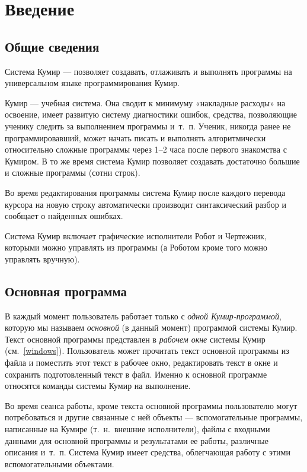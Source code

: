 \documentclass[12pt,a4paper]{article}
\begin{document}

\section{Введение}

\subsection{Общие сведения}

Система Кумир --- позволяет создавать, отлаживать и выполнять программы на универсальном языке программирования Кумир.

Кумир --- учебная система. Она сводит к минимуму «накладные расходы» на освоение, имеет развитую систему диагностики ошибок, средства, позволяющие ученику следить за выполнением программы и~т.~п. Ученик, никогда ранее не программировавший, может начать писать и выполнять алгоритмически относительно сложные программы через 1--2 часа после первого знакомства с Кумиром. В то же время система Кумир позволяет создавать достаточно большие и сложные программы (сотни строк).

Во время редактирования программы система Кумир после каждого перевода курсора на новую строку автоматически производит синтаксический разбор и сообщает о найденных ошибках.

Система Кумир включает графические исполнители Робот и Чертежник, которыми можно управлять из программы (а Роботом кроме того можно управлять вручную). 

\subsection{Основная программа}

В каждый момент  пользователь работает только с \emph{одной Кумир-программой}, которую мы называем \emph{основной} (в данный момент) программой системы Кумир. Текст основной программы представлен в \emph{рабочем окне} системы Кумир (см.~\ref{windows}). Пользователь может прочитать текст основной программы из файла и поместить этот текст в рабочее окно, редактировать текст в окне и сохранить подготовленный текст в файл. Именно к основной программе относятся команды системы Кумир на выполнение. 

Во время сеанса работы, кроме текста основной программы пользователю могут потребоваться и другие связанные с ней объекты --- вспомогательные программы, написанные на Кумире (т.~н.~внешние исполнители), файлы с входными данными для основной программы и результатами ее работы, различные описания и~т.~п. Система Кумир имеет средства, облегчающая работу с этими вспомогательными объектами. 
\end{document}
